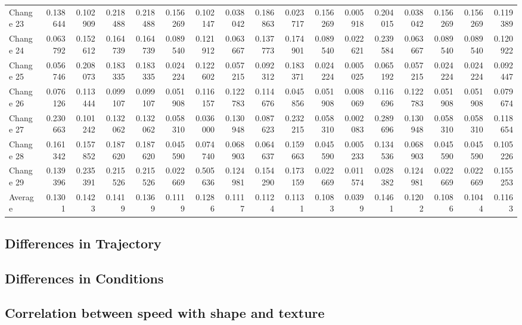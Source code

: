 \documentclass{article}
\begin{document}
\begin{landscape}
\begin{table}[htbp]
\begin{tabular}{lrrrrrrrrrrrrrrrr}
Change 23 & 0.138644 & 0.102909 & 0.218488 & 0.218488 & 0.156269 & 0.102147 & 0.038042 & 0.186863 & 0.023717 & 0.156269 & 0.005918 & 0.204015 & 0.038042 & 0.156269 & 0.156269 & 0.119389 \\
Change 24 & 0.063792 & 0.152612 & 0.164739 & 0.164739 & 0.089540 & 0.121912 & 0.063667 & 0.137773 & 0.174901 & 0.089540 & 0.022621 & 0.239584 & 0.063667 & 0.089540 & 0.089540 & 0.120922 \\
Change 25 & 0.056746 & 0.208073 & 0.183335 & 0.183335 & 0.024224 & 0.122602 & 0.057215 & 0.092312 & 0.183371 & 0.024224 & 0.005025 & 0.065192 & 0.057215 & 0.024224 & 0.024224 & 0.092447 \\
Change 26 & 0.076126 & 0.113444 & 0.099107 & 0.099107 & 0.051908 & 0.116157 & 0.122783 & 0.114676 & 0.045856 & 0.051908 & 0.008069 & 0.116696 & 0.122783 & 0.051908 & 0.051908 & 0.079674 \\
Change 27 & 0.230663 & 0.101242 & 0.132062 & 0.132062 & 0.058310 & 0.036000 & 0.130948 & 0.087623 & 0.232215 & 0.058310 & 0.002083 & 0.289696 & 0.130948 & 0.058310 & 0.058310 & 0.118654 \\
Change 28 & 0.161342 & 0.157852 & 0.187620 & 0.187620 & 0.045590 & 0.074740 & 0.068903 & 0.064637 & 0.159663 & 0.045590 & 0.005233 & 0.134536 & 0.068903 & 0.045590 & 0.045590 & 0.105226 \\
Change 29 & 0.139396 & 0.235391 & 0.215526 & 0.215526 & 0.022669 & 0.505636 & 0.124981 & 0.154290 & 0.173159 & 0.022669 & 0.011574 & 0.028382 & 0.124981 & 0.022669 & 0.022669 & 0.155253 \\
Average & 0.1301 & 0.1423 & 0.1419 & 0.1369 & 0.1119 & 0.1286 & 0.1117 & 0.1124 & 0.1131 & 0.1083 & 0.0399 & 0.1461 & 0.1202 & 0.1086 & 0.1044 & 0.1163 \\
\bottomrule
\end{tabular}
\end{table}
\end{landscape}

\subsection*{Differences in Trajectory}
\subsection*{Differences in Conditions}
\subsection*{Correlation between speed with shape and texture}
\newpage
\end{document}
